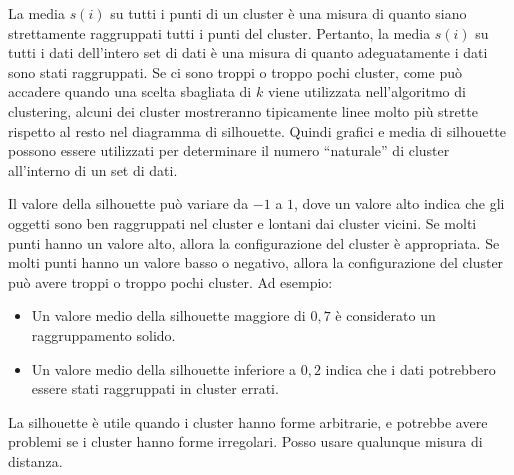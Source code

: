 La media $s(i)$ su tutti i punti di un cluster è una misura di quanto siano
strettamente raggruppati tutti i punti del cluster. Pertanto, la media $s(i)$ su
tutti i dati dell'intero set di dati è una misura di quanto adeguatamente i dati
sono stati raggruppati. Se ci sono troppi o troppo pochi cluster, come può
accadere quando una scelta sbagliata di $k$ viene utilizzata nell'algoritmo di
clustering, alcuni dei cluster mostreranno tipicamente linee molto più strette
rispetto al resto nel diagramma di silhouette. Quindi grafici e media di
silhouette possono essere utilizzati per determinare il numero “naturale” di
cluster all'interno di un set di dati.

Il valore della silhouette può variare da $-1$ a $1$, dove un valore alto indica
che gli oggetti sono ben raggruppati nel cluster e lontani dai cluster vicini.
Se molti punti hanno un valore alto, allora la configurazione del cluster è
appropriata. Se molti punti hanno un valore basso o negativo, allora la
configurazione del cluster può avere troppi o troppo pochi cluster.
Ad esempio:
\begin{itemize}
      \item Un valore medio della silhouette maggiore di $0,7$ è considerato un
            raggruppamento solido.
      \item Un valore medio della silhouette inferiore a $0,2$ indica che i
            dati potrebbero essere stati raggruppati in cluster errati.
\end{itemize}
La silhouette è utile quando i cluster hanno forme arbitrarie, e potrebbe avere
problemi se i cluster hanno forme irregolari. Posso usare qualunque misura di
distanza.